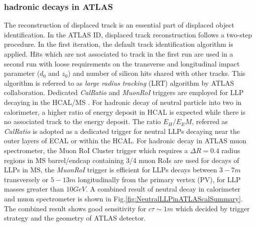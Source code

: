 \subsubsection{hadronic decays in ATLAS}
The reconstruction of displaced track is an essential part of displaced object identification. In the ATLAS ID, displaced track reconstruction follows a two-step procedure. In the first iteration, the default track identification algorithm is applied. Hits which are not associated to track in the first run are used in a second run with loose requirements on the transverse and longitudinal impact parameter ($d_0$ and $z_0$) and number of silicon hits shared with other tracks. This algorithm is referred to as \textit{large radius tracking} (LRT) algorithm by ATLAS collaboration. 
Dedicated \textit{CalRatio} and \textit{MuonRoI} triggers are employed for LLP decaying in the HCAL/MS \cite{Aaboud:2019opc,Aaboud:2017iio}. For hadronic decay of neutral particle into two  in calorimeter, a higher ratio of energy deposit in HCAL is expected while there is no associated track to the energy deposit. The ratio $E_H/E_EM$, referred as \textit{CalRatio} is adopted as a dedicated trigger for neutral LLPs decaying near the outer layers of ECAL or within the HCAL. For hadronic decay in ATLAS muon spectrometer, the Muon RoI Cluster trigger which requires a $\Delta R=0.4$ radius regions in MS barrel/endcap containing 3/4 muon RoIs \cite{Aad:2013txa} are used for decays of LLPs in MS, the \textit{MuonRoI} trigger is efficient for LLPs decays between $3-7 m$ transversely or $5-13 m$ longitudinally from the primary vertex (PV), for LLP masses greater than $10 GeV$. A combined result of neutral decay in calorimeter and muon spectrometer is shown in Fig.\ref{fig:NeutralLLPinATLAScalSummary}. The combined result shows good sensitivity for $c\tau \sim 1m$ which decided by trigger strategy and the geometry of ATLAS detector.
